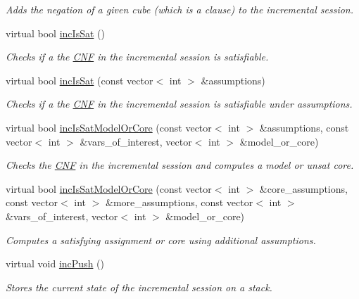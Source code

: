 \begin{DoxyCompactItemize}
\begin{DoxyCompactList}\small\item\em Adds the negation of a given cube (which is a clause) to the incremental session. \end{DoxyCompactList}\item 
virtual bool \hyperlink{classPicoSatApi_a0d1237c039315d572fb0828c59435177}{inc\-Is\-Sat} ()
\begin{DoxyCompactList}\small\item\em Checks if a the \hyperlink{classCNF}{C\-N\-F} in the incremental session is satisfiable. \end{DoxyCompactList}\item 
virtual bool \hyperlink{classPicoSatApi_abebe28c72303235d2fdc915bbf4752c0}{inc\-Is\-Sat} (const vector$<$ int $>$ \&assumptions)
\begin{DoxyCompactList}\small\item\em Checks if a the \hyperlink{classCNF}{C\-N\-F} in the incremental session is satisfiable under assumptions. \end{DoxyCompactList}\item 
virtual bool \hyperlink{classPicoSatApi_aa8c0dbf4587ff4666ce20fd325364c4a}{inc\-Is\-Sat\-Model\-Or\-Core} (const vector$<$ int $>$ \&assumptions, const vector$<$ int $>$ \&vars\-\_\-of\-\_\-interest, vector$<$ int $>$ \&model\-\_\-or\-\_\-core)
\begin{DoxyCompactList}\small\item\em Checks the \hyperlink{classCNF}{C\-N\-F} in the incremental session and computes a model or unsat core. \end{DoxyCompactList}\item 
virtual bool \hyperlink{classPicoSatApi_ada5b2d2ba3cf20b0ab007a62cc73028a}{inc\-Is\-Sat\-Model\-Or\-Core} (const vector$<$ int $>$ \&core\-\_\-assumptions, const vector$<$ int $>$ \&more\-\_\-assumptions, const vector$<$ int $>$ \&vars\-\_\-of\-\_\-interest, vector$<$ int $>$ \&model\-\_\-or\-\_\-core)
\begin{DoxyCompactList}\small\item\em Computes a satisfying assignment or core using additional assumptions. \end{DoxyCompactList}\item 
virtual void \hyperlink{classPicoSatApi_a523f9de3a59f927cb6ad0729e1caaac7}{inc\-Push} ()
\begin{DoxyCompactList}\small\item\em Stores the current state of the incremental session on a stack. \end{DoxyCompactList}\item 

\end{DoxyCompactItemize}
